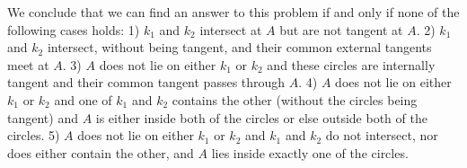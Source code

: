 \begin{mdsoln}
We conclude that we can find an answer to this problem if and only if none of the following cases holds:
1) $k_1$ and $k_2$ intersect at $A$ but are not tangent at $A$.
2) $k_1$ and $k_2$ intersect, without being tangent, and their common external tangents meet at $A$.
3) $A$ does not lie on either $k_1$ or $k_2$ and these circles are internally tangent and their common tangent passes through $A$.
4) $A$ does not lie on either $k_1$ or $k_2$ and one of $k_1$ and $k_2$ contains the other (without the circles being tangent) and $A$ is either inside both of the circles or else outside both of the circles.
5) $A$ does not lie on either $k_1$ or $k_2$ and $k_1$ and $k_2$ do not intersect, nor does either contain the other, and $A$ lies inside exactly one of the circles.
    
\end{mdsoln}
